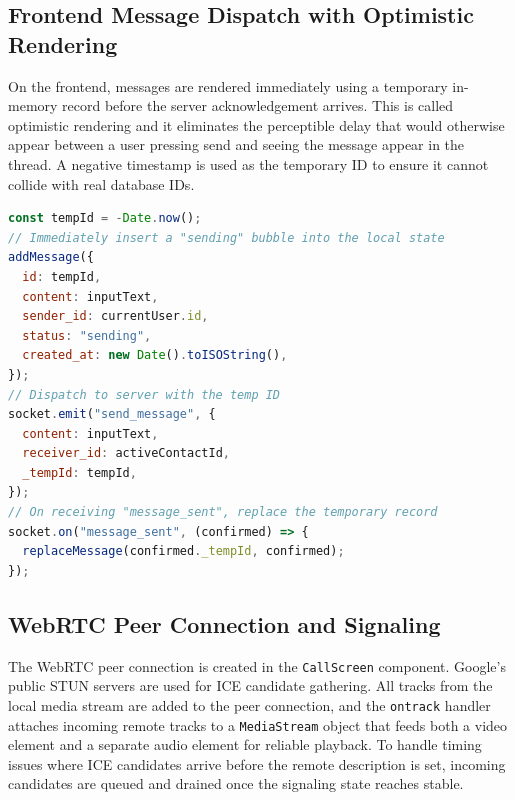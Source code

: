 \documentclass[12pt,a4paper,oneside]{report}
\begin{document}
\subsection{Frontend Message Dispatch with Optimistic Rendering}
\label{subsec:frontend-message-dispatch}

On the frontend, messages are rendered immediately using a temporary in-memory
record before the server acknowledgement arrives. This is called optimistic
rendering and it eliminates the perceptible delay that would otherwise appear
between a user pressing send and seeing the message appear in the thread. A
negative timestamp is used as the temporary ID to ensure it cannot collide with
real database IDs.

\begin{lstlisting}[language=JavaScript, caption=Optimistic Message Rendering (Frontend)]
const tempId = -Date.now();
// Immediately insert a "sending" bubble into the local state
addMessage({
  id: tempId,
  content: inputText,
  sender_id: currentUser.id,
  status: "sending",
  created_at: new Date().toISOString(),
});
// Dispatch to server with the temp ID
socket.emit("send_message", {
  content: inputText,
  receiver_id: activeContactId,
  _tempId: tempId,
});
// On receiving "message_sent", replace the temporary record
socket.on("message_sent", (confirmed) => {
  replaceMessage(confirmed._tempId, confirmed);
});
\end{lstlisting}

\subsection{WebRTC Peer Connection and Signaling}
\label{subsec:webrtc-impl}

The WebRTC peer connection is created in the \texttt{CallScreen} component.
Google's public STUN servers are used for ICE candidate gathering. All tracks
from the local media stream are added to the peer connection, and the
\texttt{ontrack} handler attaches incoming remote tracks to a \texttt{MediaStream}
object that feeds both a video element and a separate audio element for reliable
playback. To handle timing issues where ICE candidates arrive before the remote
description is set, incoming candidates are queued and drained once the
signaling state reaches stable.
\end{document}
